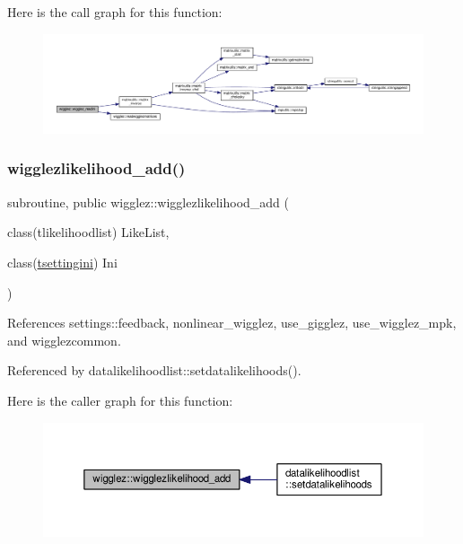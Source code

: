 Here is the call graph for this function\+:
\nopagebreak
\begin{figure}[H]
\begin{center}
\leavevmode
\includegraphics[width=350pt]{namespacewigglez_ae3e0c03dabaa4af8dbaa3d5b1b2acb29_cgraph}
\end{center}
\end{figure}
\mbox{\label{namespacewigglez_ae540392aa1fd56601b1db55cac9aaafa}} 
\subsubsection{\texorpdfstring{wigglezlikelihood\+\_\+add()}{wigglezlikelihood\_add()}}
{\footnotesize\ttfamily subroutine, public wigglez\+::wigglezlikelihood\+\_\+add (\begin{DoxyParamCaption}\item[{class(tlikelihoodlist)}]{Like\+List,  }\item[{class(\mbox{\hyperlink{structsettings_1_1tsettingini}{tsettingini}})}]{Ini }\end{DoxyParamCaption})}



References settings\+::feedback, nonlinear\+\_\+wigglez, use\+\_\+gigglez, use\+\_\+wigglez\+\_\+mpk, and wigglezcommon.



Referenced by datalikelihoodlist\+::setdatalikelihoods().

Here is the caller graph for this function\+:
\nopagebreak
\begin{figure}[H]
\begin{center}
\leavevmode
\includegraphics[width=350pt]{namespacewigglez_ae540392aa1fd56601b1db55cac9aaafa_icgraph}
\end{center}
\end{figure}


